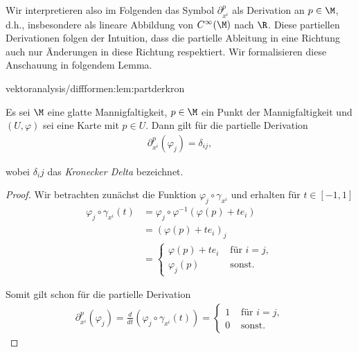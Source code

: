 \documentclass[letterpaper,10pt,english]{jupyterBook}
\begin{document}
\par
Wir interpretieren also im Folgenden das Symbol \(\partial_{x^{i}}^p\) als Derivation an \(p\in\M\), d.h., insbesondere als lineare Abbildung von \(C^\infty(\M)\) nach \(\R\).
Diese partiellen Derivationen folgen der Intuition, dass die partielle Ableitung in eine Richtung auch nur Änderungen in diese Richtung respektiert.
Wir formalisieren diese Anschauung in folgendem Lemma.
\begin{lemma}{}{vektoranalysis/diffformen:lem:partderkron}



\par
Es sei \(\M\) eine glatte Mannigfaltigkeit, \(p\in\M\) ein Punkt der Mannigfaltigkeit und \((U,\varphi)\) sei eine Karte mit \(p\in U\).
Dann gilt für die partielle Derivation
\begin{align*}
\partial_{x^i}^p(\varphi_j) = \delta_{ij},
\end{align*}
\par
wobei \(\delta_ij\) das \emph{Kronecker Delta} bezeichnet.
\end{lemma}

\begin{proof}
 Wir betrachten zunächst die Funktion \(\varphi_j \circ \gamma_{x^i}\) und erhalten für \(t\in [-1,1]\)
\begin{align*}
\varphi_j \circ \gamma_{x^i}(t)
&= \varphi_j \circ \varphi^{-1}(\varphi(p) + t e_i)\\
&= (\varphi(p) + t e_i)_j\\ 
&=
\begin{cases}
\varphi(p) + t e_i &\text{ für } i=j,\\
\varphi_j(p)&\text{ sonst}.
\end{cases}
\end{align*}
\par
Somit gilt schon für die partielle Derivation
\begin{align*}
\partial_{x^i}^p(\varphi_j)=
\frac{d}{dt} (\varphi_j \circ \gamma_{x^i}(t)) = 
\begin{cases}
1&\text{ für } i=j,\\
0&\text{ sonst}.
\end{cases}
\end{align*}\end{proof}
\end{document}
